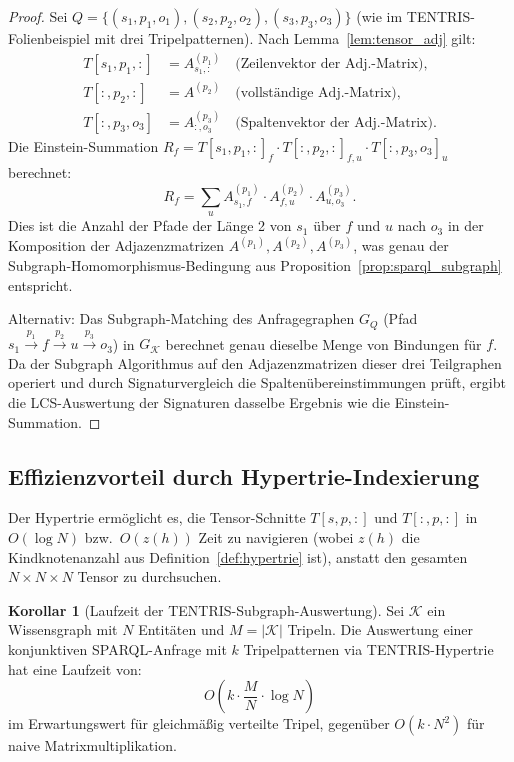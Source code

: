 ﻿\documentclass[a4paper,12pt]{article}
\theoremstyle{definition}
\newtheorem{korollar}{Korollar}
\begin{document}
\begin{proof}
Sei $Q = \{(s_1,p_1,o_1), (s_2,p_2,o_2), (s_3,p_3,o_3)\}$ (wie im TENTRIS-Folienbeispiel
mit drei Tripelpatternen). Nach Lemma~\ref{lem:tensor_adj} gilt:
\begin{align*}
  T[s_1,p_1,:] &= A^{(p_1)}_{s_1,:} \quad \text{(Zeilenvektor der Adj.-Matrix)}, \\
  T[:,p_2,:]   &= A^{(p_2)}           \quad \text{(vollständige Adj.-Matrix)}, \\
  T[:,p_3,o_3] &= A^{(p_3)}_{:,o_3} \quad \text{(Spaltenvektor der Adj.-Matrix)}.
\end{align*}
Die Einstein-Summation
$R_f = T[s_1,p_1,:]_f \cdot T[:,p_2,:]_{f,u} \cdot T[:,p_3,o_3]_u$
berechnet:
\[
  R_f = \sum_u A^{(p_1)}_{s_1,f} \cdot A^{(p_2)}_{f,u} \cdot A^{(p_3)}_{u,o_3}.
\]
Dies ist die Anzahl der Pfade der Länge 2 von $s_1$ über $f$ und $u$ nach $o_3$
in der Komposition der Adjazenzmatrizen $A^{(p_1)}, A^{(p_2)}, A^{(p_3)}$, was
genau der Subgraph-Homomorphismus-Bedingung aus Proposition~\ref{prop:sparql_subgraph}
entspricht.

Alternativ: Das Subgraph-Matching des Anfragegraphen $G_Q$ (Pfad
$s_1 \xrightarrow{p_1} f \xrightarrow{p_2} u \xrightarrow{p_3} o_3$) in
$G_{\mathcal{K}}$ berechnet genau dieselbe Menge von Bindungen für $f$.
Da der Subgraph Algorithmus auf den Adjazenzmatrizen dieser drei Teilgraphen
operiert und durch Signaturvergleich die Spaltenübereinstimmungen prüft, ergibt
die LCS-Auswertung der Signaturen dasselbe Ergebnis wie die Einstein-Summation.
\end{proof}

\subsection{Effizienzvorteil durch Hypertrie-Indexierung}

Der Hypertrie ermöglicht es, die Tensor-Schnitte $T[s,p,:]$ und $T[:,p,:]$ in
$O(\log N)$ bzw.\ $O(z(h))$ Zeit zu navigieren (wobei $z(h)$ die Kindknotenanzahl
aus Definition~\ref{def:hypertrie} ist), anstatt den gesamten $N \times N \times N$
Tensor zu durchsuchen.

\begin{korollar}[Laufzeit der TENTRIS-Subgraph-Auswertung]
Sei $\mathcal{K}$ ein Wissensgraph mit $N$ Entitäten und $M = |\mathcal{K}|$ Tripeln.
Die Auswertung einer konjunktiven SPARQL-Anfrage mit $k$ Tripelpatternen via
TENTRIS-Hypertrie hat eine Laufzeit von:
\[
  O\!\left(k \cdot \frac{M}{N} \cdot \log N\right)
\]
im Erwartungswert für gleichmäßig verteilte Tripel, gegenüber $O(k \cdot N^2)$ für
naive Matrixmultiplikation.
\end{korollar}
\end{document}
